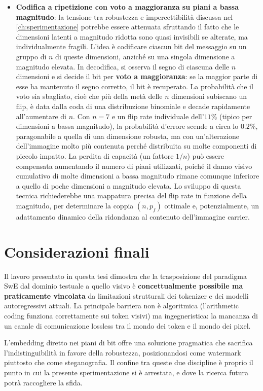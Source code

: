 \begin{itemize}
	\item \textbf{Codifica a ripetizione con voto a maggioranza su piani a bassa magnitudo}: la tensione tra robustezza e impercettibilità discussa nel \autoref{ch:sperimentazione} potrebbe essere attenuata sfruttando il fatto che le dimensioni latenti a magnitudo ridotta sono quasi invisibili se alterate, ma individualmente fragili. L'idea è codificare ciascun bit del messaggio su un gruppo di $n$ di queste dimensioni, anziché su una singola dimensione a magnitudo elevata. In decodifica, si osserva il segno di ciascuna delle $n$ dimensioni e si decide il bit per \textbf{voto a maggioranza}: se la maggior parte di esse ha mantenuto il segno corretto, il bit è recuperato. La probabilità che il voto sia sbagliato, cioè che più della metà delle $n$ dimensioni subiscano un flip, è data dalla coda di una distribuzione binomiale e decade rapidamente all'aumentare di $n$. Con $n=7$ e un flip rate individuale dell'$11\%$ (tipico per dimensioni a bassa magnitudo), la probabilità d'errore scende a circa lo $0.2\%$, paragonabile a quella di una dimensione robusta, ma con un'alterazione dell'immagine molto più contenuta perché distribuita su molte componenti di piccolo impatto. La perdita di capacità (un fattore $1/n$) può essere compensata aumentando il numero di piani utilizzati, poiché il danno visivo cumulativo di molte dimensioni a bassa magnitudo rimane comunque inferiore a quello di poche dimensioni a magnitudo elevata. Lo sviluppo di questa tecnica richiederebbe una mappatura precisa del flip rate in funzione della magnitudo, per determinare la coppia $(n, p_f)$ ottimale e, potenzialmente, un adattamento dinamico della ridondanza al contenuto dell'immagine carrier.
\end{itemize}

\section{Considerazioni finali}

Il lavoro presentato in questa tesi dimostra che la trasposizione del paradigma SwE dal dominio testuale a quello visivo è \textbf{concettualmente possibile ma praticamente vincolata} da limitazioni strutturali dei tokenizer e dei modelli autoregressivi attuali. La principale barriera non è algoritmica (l'arithmetic coding funziona correttamente sui token visivi) ma ingegneristica: la mancanza di un canale di comunicazione lossless tra il mondo dei token e il mondo dei pixel.

L'embedding diretto nei piani di bit offre una soluzione pragmatica che sacrifica l'indistinguibilità in favore della robustezza, posizionandosi come watermark piuttosto che come steganografia. Il confine tra queste due discipline è proprio il punto in cui la presente sperimentazione si è arrestata, e dove la ricerca futura potrà raccogliere la sfida.
